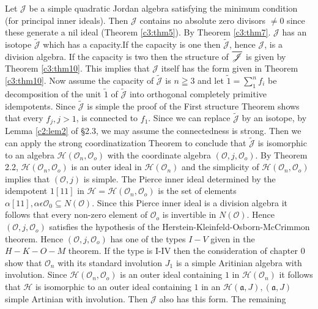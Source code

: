 Let $\mathscr{J}$ be a simple quadratic Jordan algebra satisfying the
minimum condition (for principal inner ideals). Then $\mathscr{J}$
contains no absolute zero divisors $\neq 0$ since these generate a nil
ideal (Theorem \ref{c3:thm5}). By Theorem \ref{c3:thm7}. $\mathscr{J}$
has an isotope 
$\tilde{\mathscr{J}}$ which has a capacity.\pageoriginale If
the capacity is one then $\tilde{\mathscr{J}}$, hence $\mathscr{J}$, is a
division algebra. If the capacity is two then the structure of
$\overline{\mathscr{J}}$ is given by Theorem \ref{c3:thm10}. This implies that
$\mathscr{J}$ itself has the form given in Theorem
\ref{c3:thm10}. Now assume the capacity of $\tilde{\mathscr{J}}$ is
$n\geqq 3$ and 
let $\tilde{1}=\sum\limits_{1}^{n}f_i$ be decomposition of the unit
$\tilde{1}$ of $\tilde{\mathscr{J}}$ into orthogonal completely primitive
idempotents. Since $\tilde{\mathscr{J}}$ is simple the proof of the First
structure Theorem shows that every $f_j, j>1$, is connected to
$f_1$. Since we can replace $\tilde{\mathscr{J}}$ by an isotope, by Lemma
\ref{c2:lem2} of \S 2.3, we may assume the connectedness is strong. Then we can
apply the strong coordinatization Theorem to conclude that
$\tilde{\mathscr{J}}$ is isomorphic to an algebra
$\mathscr{H}(\mathcal{O}_n,\mathcal{O}_o)$ with the coordinate algebra
$(\mathcal{O},j,\mathcal{O}_o)$. By Theorem 2.2,
$\mathscr{H}(\mathcal{O}_n,\mathcal{O}_o)$ is an outer ideal in
$\mathscr{H}(\mathcal{O}_n)$ and the simplicity of
$\mathscr{H}(\mathcal{O}_n,\mathcal{O}_o)$ implies that
$(\mathcal{O},j)$ is simple. The Pierce inner ideal determined by the
idempotent $1[11]$ in $\mathscr{H}=\mathscr{H}(\mathcal{O}_n,
\mathcal{O}_o)$ is the set of elements $\alpha[11], \alpha \epsilon
\mathcal{O}_0\subseteq N(\mathcal{O})$. Since this Pierce inner ideal
is a division algebra it follows that every non-zero element of
$\mathcal{O}_o$ is invertible in $N(\mathcal{O})$. Hence
$(\mathcal{O},j,\mathcal{O}_o)$ satisfies the hypothesis of the
Herstein-Kleinfeld-Osborn-McCrimmon theorem. Hence
$(\mathcal{O},j,\mathcal{O}_o)$ has one of the types $I-V$ given in the
$H-K-O-M$ theorem. If the type is I-IV then the consideration of
chapter 0 show that $\mathcal{O}_n$ with its standard involution $J_1$
is a simple Aritinian algebra with involution. Since
$\mathscr{H}(\mathcal{O}_n,\mathcal{O}_o)$ is an outer ideal
containing $1$ in $\mathscr{H}(\mathcal{O}_n)$ it follows that
$\mathscr{H}$ is isomorphic to an outer ideal containing $1$ in
an $\mathscr{H}(\mathfrak{a},J),(\mathfrak{a},J)$ simple Artinian
with involution. Then $\mathscr{J}$ also has this form. The remaining
